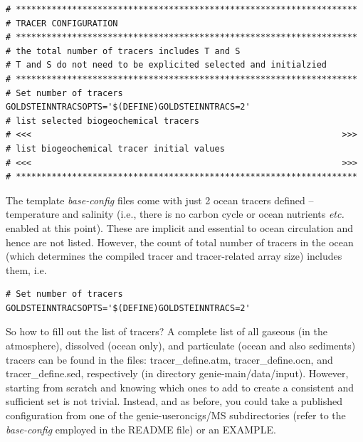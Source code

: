 \footnotesize\vspace{-2pt}\begin{verbatim}
# *******************************************************************
# TRACER CONFIGURATION
# *******************************************************************
# the total number of tracers includes T and S
# T and S do not need to be explicited selected and initialzied
# *******************************************************************
# Set number of tracers
GOLDSTEINNTRACSOPTS='$(DEFINE)GOLDSTEINNTRACS=2'
# list selected biogeochemical tracers
# <<<                                                             >>>
# list biogeochemical tracer initial values
# <<<                                                             >>>
# *******************************************************************
\end{verbatim}\vspace{-2pt}\normalsize

\noindent The template \textit{base-config} files come with just 2 ocean tracers defined -- temperature and salinity (i.e., there is no carbon cycle or ocean nutrients \textit{etc.} enabled at this point). These are implicit and essential to ocean circulation and hence are not  listed. However, the count of total number of tracers in the ocean (which determines the compiled tracer and tracer-related array size) includes them, i.e.

\footnotesize\vspace{-2pt}\begin{verbatim}
# Set number of tracers
GOLDSTEINNTRACSOPTS='$(DEFINE)GOLDSTEINNTRACS=2'
\end{verbatim}\vspace{-2pt}\normalsize

So how to fill out the list of tracers? A complete list of all gaseous (in the atmosphere), dissolved (ocean only), and particulate (ocean and also sediments) tracers can be found in the files: \textsf{\footnotesize tracer\_define.atm}, \textsf{\footnotesize tracer\_define.ocn}, and \textsf{\footnotesize tracer\_define.sed}, respectively (in directory \textsf{\footnotesize genie-main/data/input}). However, starting from scratch and knowing which ones to add to create a consistent and sufficient set is not trivial. Instead, and as before, you could take a published configuration from one of the \textsf{\footnotesize genie-useroncigs/MS} subdirectories (refer to the \textit{base-config} employed in the README file) or an EXAMPLE.

